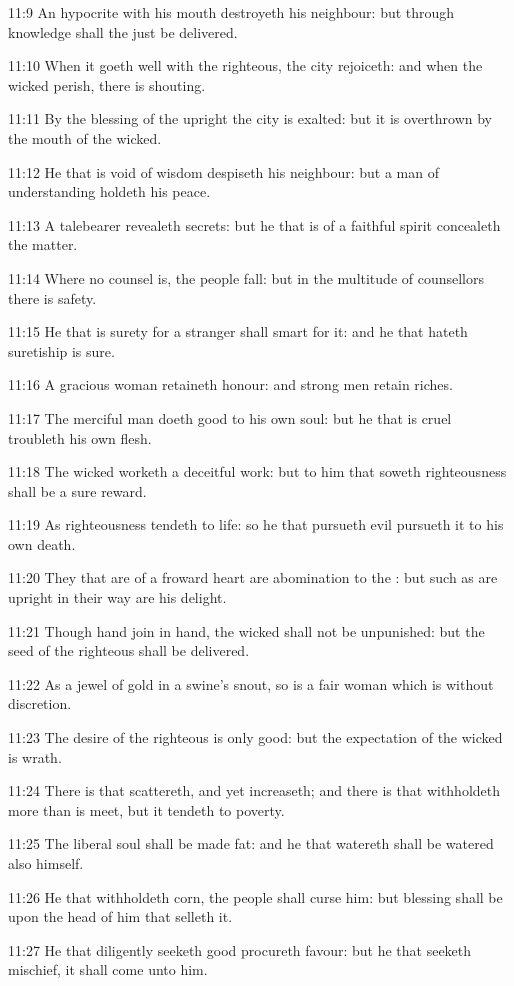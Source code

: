 11:9 An hypocrite with his mouth destroyeth his neighbour: but through
knowledge shall the just be delivered.

11:10 When it goeth well with the righteous, the city rejoiceth: and
when the wicked perish, there is shouting.

11:11 By the blessing of the upright the city is exalted: but it is
overthrown by the mouth of the wicked.

11:12 He that is void of wisdom despiseth his neighbour: but a man of
understanding holdeth his peace.

11:13 A talebearer revealeth secrets: but he that is of a faithful
spirit concealeth the matter.

11:14 Where no counsel is, the people fall: but in the multitude of
counsellors there is safety.

11:15 He that is surety for a stranger shall smart for it: and he that
hateth suretiship is sure.

11:16 A gracious woman retaineth honour: and strong men retain riches.

11:17 The merciful man doeth good to his own soul: but he that is
cruel troubleth his own flesh.

11:18 The wicked worketh a deceitful work: but to him that soweth
righteousness shall be a sure reward.

11:19 As righteousness tendeth to life: so he that pursueth evil
pursueth it to his own death.

11:20 They that are of a froward heart are abomination to the \LORD:
but such as are upright in their way are his delight.

11:21 Though hand join in hand, the wicked shall not be unpunished:
but the seed of the righteous shall be delivered.

11:22 As a jewel of gold in a swine's snout, so is a fair woman which
is without discretion.

11:23 The desire of the righteous is only good: but the expectation of
the wicked is wrath.

11:24 There is that scattereth, and yet increaseth; and there is that
withholdeth more than is meet, but it tendeth to poverty.

11:25 The liberal soul shall be made fat: and he that watereth shall
be watered also himself.

11:26 He that withholdeth corn, the people shall curse him: but
blessing shall be upon the head of him that selleth it.

11:27 He that diligently seeketh good procureth favour: but he that
seeketh mischief, it shall come unto him.

